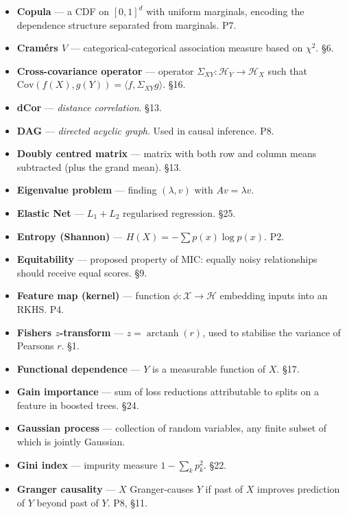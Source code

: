 \documentclass{article}
\begin{document}
\begin{itemize}
\item
  \textbf{Copula} --- a CDF on \([0, 1]^d\) with uniform marginals,
  encoding the dependence structure separated from marginals. P7.
\item
  \textbf{Cramér\textquotesingle s \(V\)} --- categorical-categorical
  association measure based on \(\chi^2\). §6.
\item
  \textbf{Cross-covariance operator} --- operator
  \(\Sigma_{XY}: \mathcal{H}_Y \to \mathcal{H}_X\) such that
  \(\mathrm{Cov}(f(X), g(Y)) = \langle f, \Sigma_{XY} g \rangle\). §16.
\item
  \textbf{dCor} --- \emph{distance correlation}. §13.
\item
  \textbf{DAG} --- \emph{directed acyclic graph}. Used in causal
  inference. P8.
\item
  \textbf{Doubly centred matrix} --- matrix with both row and column
  means subtracted (plus the grand mean). §13.
\item
  \textbf{Eigenvalue problem} --- finding \((\lambda, v)\) with
  \(Av = \lambda v\).
\item
  \textbf{Elastic Net} --- \(L_1 + L_2\) regularised regression. §25.
\item
  \textbf{Entropy (Shannon)} --- \(H(X) = -\sum p(x) \log p(x)\). P2.
\item
  \textbf{Equitability} --- proposed property of MIC: equally noisy
  relationships should receive equal scores. §9.
\item
  \textbf{Feature map (kernel)} --- function
  \(\phi: \mathcal{X} \to \mathcal{H}\) embedding inputs into an RKHS.
  P4.
\item
  \textbf{Fisher\textquotesingle s \(z\)-transform} ---
  \(z = \operatorname{arctanh}(r)\), used to stabilise the variance of
  Pearson\textquotesingle s \(r\). §1.
\item
  \textbf{Functional dependence} --- \(Y\) is a measurable function of
  \(X\). §17.
\item
  \textbf{Gain importance} --- sum of loss reductions attributable to
  splits on a feature in boosted trees. §24.
\item
  \textbf{Gaussian process} --- collection of random variables, any
  finite subset of which is jointly Gaussian.
\item
  \textbf{Gini index} --- impurity measure \(1 - \sum_k p_k^2\). §22.
\item
  \textbf{Granger causality} --- \(X\) Granger-causes \(Y\) if past of
  \(X\) improves prediction of \(Y\) beyond past of \(Y\). P8, §11.

\end{itemize}
\end{document}
